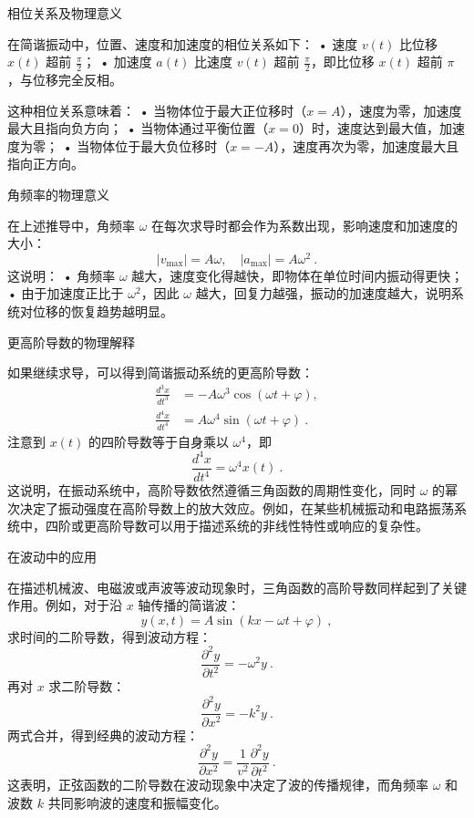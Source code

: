 相位关系及物理意义

在简谐振动中，位置、速度和加速度的相位关系如下：
	•	速度 $v(t)$ 比位移 $x(t)$ 超前 $\frac{\pi}{2}$；
	•	加速度 $a(t)$ 比速度 $v(t)$ 超前 $\frac{\pi}{2}$，即比位移 $x(t)$ 超前 $\pi$，与位移完全反相。

这种相位关系意味着：
	•	当物体位于最大正位移时（$x = A$），速度为零，加速度最大且指向负方向；
	•	当物体通过平衡位置（$x = 0$）时，速度达到最大值，加速度为零；
	•	当物体位于最大负位移时（$x = -A$），速度再次为零，加速度最大且指向正方向。

角频率的物理意义

在上述推导中，角频率 $\omega$ 在每次求导时都会作为系数出现，影响速度和加速度的大小：
\begin{equation}
|v_{\max}| = A\omega, \quad |a_{\max}| = A\omega^2~.
\end{equation}
这说明：
	•	角频率 $\omega$ 越大，速度变化得越快，即物体在单位时间内振动得更快；
	•	由于加速度正比于 $\omega^2$，因此 $\omega$ 越大，回复力越强，振动的加速度越大，说明系统对位移的恢复趋势越明显。

更高阶导数的物理解释

如果继续求导，可以得到简谐振动系统的更高阶导数：
\begin{align*}
\frac{d^3x}{dt^3} &= -A\omega^3 \cos(\omega t + \varphi), \\
\frac{d^4x}{dt^4} &= A\omega^4 \sin(\omega t + \varphi)~.
\end{align*}
注意到 $x(t)$ 的四阶导数等于自身乘以 $\omega^4$，即
\begin{equation}
\frac{d^4x}{dt^4} = \omega^4 x(t)~.
\end{equation}
这说明，在振动系统中，高阶导数依然遵循三角函数的周期性变化，同时 $\omega$ 的幂次决定了振动强度在高阶导数上的放大效应。例如，在某些机械振动和电路振荡系统中，四阶或更高阶导数可以用于描述系统的非线性特性或响应的复杂性。

在波动中的应用

在描述机械波、电磁波或声波等波动现象时，三角函数的高阶导数同样起到了关键作用。例如，对于沿 $x$ 轴传播的简谐波：
\begin{equation}
y(x,t) = A \sin(kx - \omega t + \varphi)~,
\end{equation}
求时间的二阶导数，得到波动方程：
\begin{equation}
\frac{\partial^2 y}{\partial t^2} = -\omega^2 y~.
\end{equation}
再对 $x$ 求二阶导数：
\begin{equation}
\frac{\partial^2 y}{\partial x^2} = -k^2 y~.
\end{equation}
两式合并，得到经典的波动方程：
\begin{equation}
\frac{\partial^2 y}{\partial x^2} = \frac{1}{v^2} \frac{\partial^2 y}{\partial t^2}~.
\end{equation}
这表明，正弦函数的二阶导数在波动现象中决定了波的传播规律，而角频率 $\omega$ 和波数 $k$ 共同影响波的速度和振幅变化。

